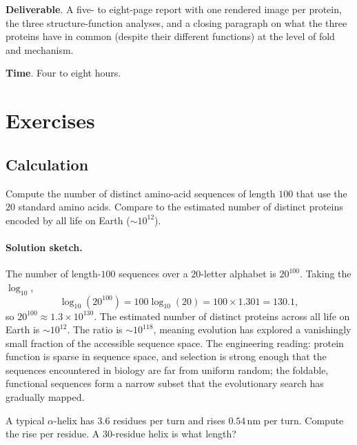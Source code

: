 \begin{project}
\textbf{Deliverable}. A five- to eight-page report with one rendered
image per protein, the three structure-function analyses, and a
closing paragraph on what the three proteins have in common (despite
their different functions) at the level of fold and mechanism.

\textbf{Time}. Four to eight hours.
\end{project}

\section{Exercises}

\subsection*{Calculation}

\begin{exercise}
Compute the number of distinct amino-acid sequences of length $100$
that use the $20$ standard amino acids. Compare to the estimated number
of distinct proteins encoded by all life on Earth ($\sim 10^{12}$).
\end{exercise}

\paragraph{Solution sketch.}
The number of length-$100$ sequences over a $20$-letter alphabet is
$20^{100}$. Taking the $\log_{10}$,
\[
\log_{10}(20^{100}) = 100 \log_{10}(20) = 100 \times 1.301 = 130.1,
\]
so $20^{100} \approx 1.3 \times 10^{130}$. The estimated number of
distinct proteins across all life on Earth is $\sim 10^{12}$. The
ratio is $\sim 10^{118}$, meaning evolution has explored a vanishingly
small fraction of the accessible sequence space. The engineering
reading: protein function is sparse in sequence space, and selection
is strong enough that the sequences encountered in biology are far
from uniform random; the foldable, functional sequences form a
narrow subset that the evolutionary search has gradually mapped.

\begin{exercise}
A typical $\alpha$-helix has $3.6$ residues per turn and rises
$0.54\,\text{nm}$ per turn. Compute the rise per residue. A
$30$-residue helix is what length?
\end{exercise}

